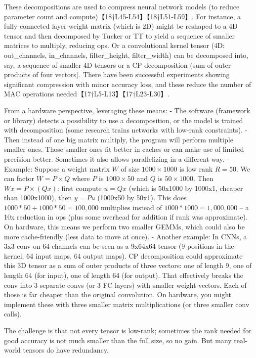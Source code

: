 These decompositions are used to compress neural network models (to reduce parameter count and compute)【18†L45-L54】【18†L51-L59】. For instance, a fully-connected layer weight matrix (which is 2D) might be reshaped to a 4D tensor and then decomposed by Tucker or TT to yield a sequence of smaller matrices to multiply, reducing ops. Or a convolutional kernel tensor (4D: out\_channels, in\_channels, filter\_height, filter\_width) can be decomposed into, say, a sequence of smaller 4D tensors or a CP decomposition (sum of outer products of four vectors). There have been successful experiments showing significant compression with minor accuracy loss, and these reduce the number of MAC operations needed【17†L5-L13】【17†L23-L30】.

From a hardware perspective, leveraging these means:
- The software (framework or library) detects a possibility to use a decomposition, or the model is trained with decomposition (some research trains networks with low-rank constraints).
- Then instead of one big matrix multiply, the program will perform multiple smaller ones. Those smaller ones fit better in caches or can make use of limited precision better. Sometimes it also allows parallelizing in a different way.
- Example: Suppose a weight matrix $W$ of size $1000 \times 1000$ is low rank $R=50$. We can factor $W = P \times Q$ where $P$ is $1000\times 50$ and $Q$ is $50 \times 1000$. Then $Wx = P \times (Qx)$: first compute $u = Qx$ (which is 50x1000 by 1000x1, cheaper than 1000x1000), then $y = P u$ (1000x50 by 50x1). This does $1000*50 + 1000*50 = 100,000$ multiplies instead of $1000*1000 = 1,000,000$ – a 10x reduction in ops (plus some overhead for addition if rank was approximate). On hardware, this means we perform two smaller GEMMs, which could also be more cache-friendly (less data to move at once).
- Another example: In CNNs, a 3x3 conv on 64 channels can be seen as a 9x64x64 tensor (9 positions in the kernel, 64 input maps, 64 output maps). CP decomposition could approximate this 3D tensor as a sum of outer products of three vectors: one of length 9, one of length 64 (for input), one of length 64 (for output). That effectively breaks the conv into 3 separate convs (or 3 FC layers) with smaller weight vectors. Each of those is far cheaper than the original convolution. On hardware, you might implement these with three smaller matrix multiplications (or three smaller conv calls).

The challenge is that not every tensor is low-rank; sometimes the rank needed for good accuracy is not much smaller than the full size, so no gain. But many real-world tensors do have redundancy.

